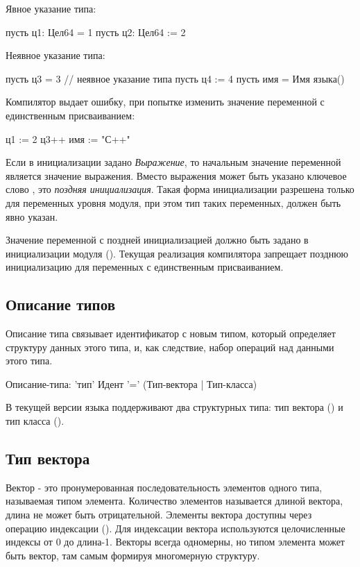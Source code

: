 Явное указание типа:
\begin{Trivil}[vspace=2pt]
пусть ц1: Цел64 = 1 
пусть ц2: Цел64 := 2
\end{Trivil}

Неявное указание типа:
\begin{Trivil}[vspace=2pt]
пусть ц3 = 3   // неявное указание типа
пусть ц4 := 4
пусть имя = Имя языка() 
\end{Trivil}

Компилятор выдает ошибку, при попытке изменить значение переменной с единственным присваиванием:
\begin{SampleErr}[vspace=2pt]
    ц1 := 2 
    ц3++
    имя := "С++"
\end{SampleErr}

Если в инициализации задано \emph{Выражение}, то начальным значение переменной является значение выражения.
Вместо выражения может быть указано ключевое слово , это \emph{поздняя инициализация}. 
Такая форма инициализации разрешена только для переменных уровня модуля, при этом тип таких переменных, должен быть явно указан.

Значение переменной с поздней инициализацией должно быть задано в инициализации модуля (). 
Текущая реализация компилятора запрещает позднюю инициализацию для переменных с единственным присваиванием.

\hypertarget{types}{%
\subsection{Описание типов}\label{decls:types}}

Описание типа связывает идентификатор с новым типом, который определяет структуру данных этого типа, и, как следствие, набор операций над данными этого типа.

\begin{Grammar}
Описание-типа: 'тип' Идент '=' (Тип-вектора | Тип-класса)
\end{Grammar} 

В текущей версии языка поддерживают два структурных типа: тип вектора () и тип класса ().

\hypertarget{vector-types}{%
\subsection{Тип вектора}\label{decls:vector-types}}

Вектор - это пронумерованная последовательность элементов одного типа, называемая типом элемента. Количество элементов называется длиной вектора, длина не может быть отрицательной. Элементы вектора доступны через операцию индексации (). Для индексации вектора используются целочисленные индексы  от 0 до длина-1. Векторы всегда одномерны, но типом элемента может быть вектор, там самым формируя многомерную структуру.

